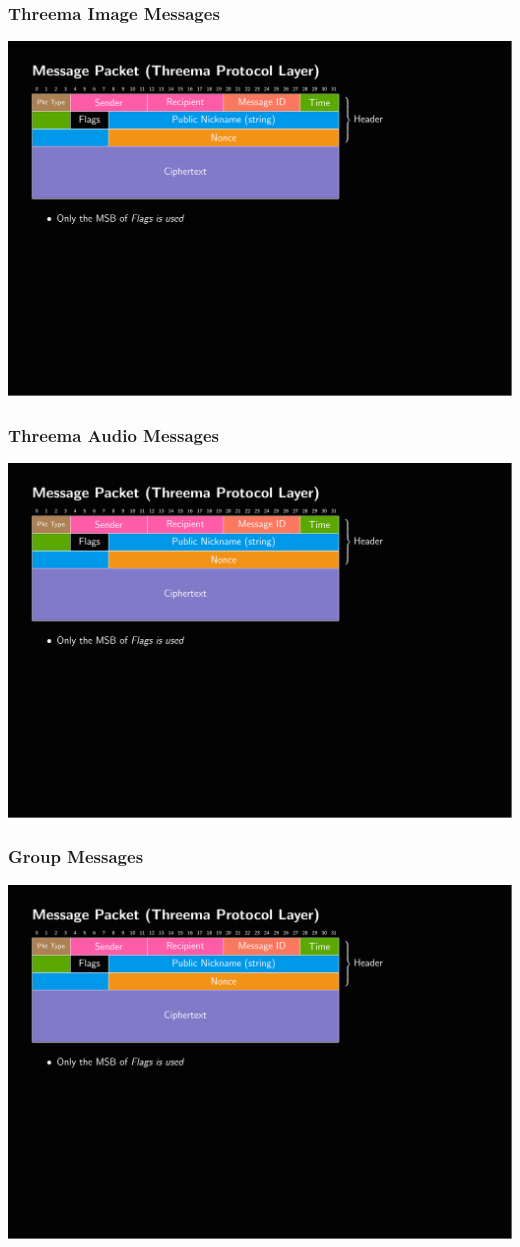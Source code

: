 \documentclass[aspectratio=169]{beamer}
\begin{document}
\begin{frame}
	\frametitle{Threema Image Messages}
	\includegraphics[page=4,clip,trim={.99cm 7.5cm 3.2cm 1cm},width=\textwidth]{out/messages.pdf}
\end{frame}

\begin{frame}
	\frametitle{Threema Audio Messages}
	\includegraphics[page=5,clip,trim={.99cm 7.5cm 3.2cm 1cm},width=\textwidth]{out/messages.pdf}
\end{frame}

\begin{frame}
	\frametitle{Group Messages}
	\includegraphics[page=6,clip,trim={.99cm 7.5cm 3.2cm 1cm},width=\textwidth]{out/messages.pdf}
\end{frame}
\end{document}
